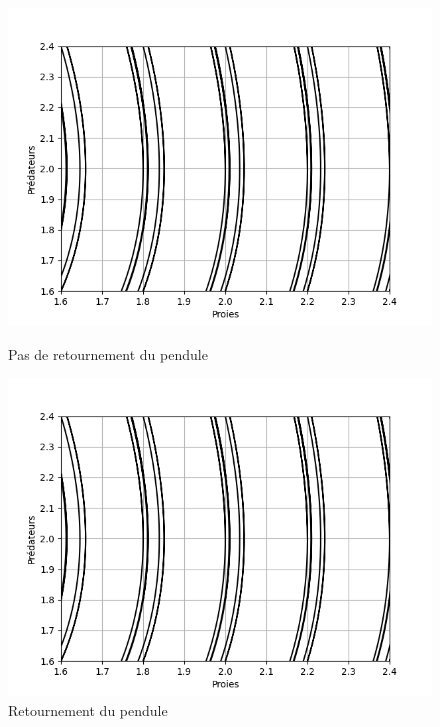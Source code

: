 \begin{figure} [htbp!]
	\begin{minipage}[c]{0.5\textwidth}
		\centering
		\includegraphics[width=\textwidth]{res/behaviour}%
		\caption{Pas de retournement du pendule}
		\label{fig:no_retournement}
	\end{minipage}\hfill
	\begin{minipage}[c]{0.5\textwidth}
		\centering
		\includegraphics[width=\textwidth]{res/behaviour}%
		\caption{Retournement du pendule}
		\label{fig:retournement}
	\end{minipage}
\end{figure}

